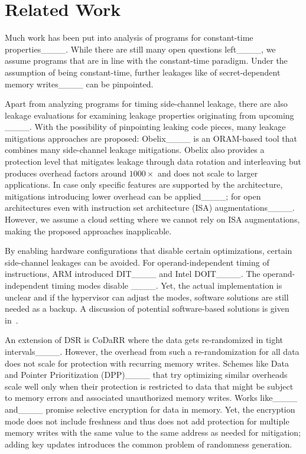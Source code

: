 \section{Related Work}
\label{sec:related-work}
Much work has been put into analysis of programs for constant-time properties____.
While there are still many open questions left____, we assume programs that are in line with the constant-time paradigm.
Under the assumption of being constant-time, further leakages like \ssss{} of secret-dependent memory writes____ can be pinpointed.

Apart from analyzing programs for timing side-channel leakage, there are also leakage evaluations for examining leakage properties originating from upcoming \uarchopts{}____.
With the possibility of pinpointing leaking code pieces, many leakage mitigations approaches are proposed:
Obelix____ is an ORAM-based tool that combines many side-channel leakage mitigations.
Obelix also provides a protection level that mitigates \ctsc{} leakage through data rotation and interleaving but produces overhead factors around $1000\times$ and does not scale to larger applications.
In case only specific features are supported by the architecture, mitigations introducing lower overhead can be applied____; for open architectures even with instruction set architecture (ISA) augmentations____.
However, we assume a cloud setting where we cannot rely on ISA augmentations, making the proposed approaches inapplicable.

By enabling hardware configurations that disable certain optimizations, certain side-channel leakages can be avoided.
For operand-independent timing of instructions, ARM introduced DIT____ and Intel DOIT____.
The operand-independent timing modes disable \dmping{}____.
Yet, the actual implementation is unclear and if the hypervisor can adjust the modes, software solutions are still needed as a backup.
A discussion of potential software-based solutions is given in~.

An extension of DSR is CoDaRR where the data gets re-randomized in tight intervals____.
However, the overhead from such a re-randomization for all data does not scale for \ctsc{} protection with recurring memory writes.
Schemes like Data and Pointer Prioritization (DPP)____ that try optimizing similar overheads scale well only when their protection is restricted to data that might be subject to memory errors and associated unauthorized memory writes.
Works like____ and____ promise selective encryption for data in memory.
Yet, the encryption mode does not include freshness and thus does not add protection for multiple memory writes with the same value to the same address as needed for \ctsc{} mitigation; adding key updates introduces the common problem of randomness generation.


